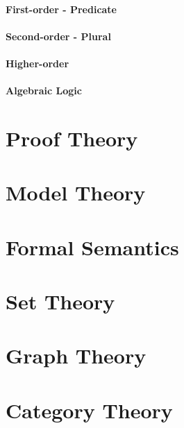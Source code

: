 \documentclass{article}
\begin{document}
\subsection{First-order - Predicate}

\subsection{Second-order - Plural}

\subsection{Higher-order}

\subsection{Algebraic Logic}



\part{Proof Theory}


\part{Model Theory}


\part{Formal Semantics}


\part{Set Theory}


\part{Graph Theory}


\part{Category Theory}

\end{document}
